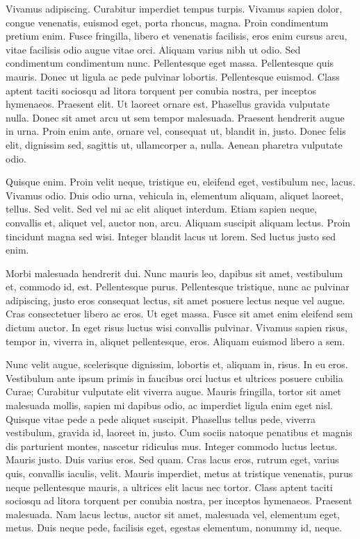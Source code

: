 \documentclass{article}
\begin{document}
Vivamus adipiscing. Curabitur imperdiet tempus turpis. Vivamus sapien dolor,
congue venenatis, euismod eget, porta rhoncus, magna. Proin condimentum pretium
enim. Fusce fringilla, libero et venenatis facilisis, eros enim cursus arcu,
vitae facilisis odio augue vitae orci. Aliquam varius nibh ut odio. Sed
condimentum condimentum nunc. Pellentesque eget massa. Pellentesque quis
mauris. Donec ut ligula ac pede pulvinar lobortis. Pellentesque euismod. Class
aptent taciti sociosqu ad litora torquent per conubia nostra, per inceptos
hymenaeos. Praesent elit. Ut laoreet ornare est. Phasellus gravida vulputate
nulla. Donec sit amet arcu ut sem tempor malesuada. Praesent hendrerit augue in
urna. Proin enim ante, ornare vel, consequat ut, blandit in, justo. Donec felis
elit, dignissim sed, sagittis ut, ullamcorper a, nulla. Aenean pharetra vulputate
odio.

Quisque enim. Proin velit neque, tristique eu, eleifend eget, vestibulum
nec, lacus. Vivamus odio. Duis odio urna, vehicula in, elementum aliquam,
aliquet laoreet, tellus. Sed velit. Sed vel mi ac elit aliquet interdum. Etiam
sapien neque, convallis et, aliquet vel, auctor non, arcu. Aliquam suscipit
aliquam lectus. Proin tincidunt magna sed wisi. Integer blandit lacus ut lorem.
Sed luctus justo sed enim.

Morbi malesuada hendrerit dui. Nunc mauris leo, dapibus sit amet, vestibulum
et, commodo id, est. Pellentesque purus. Pellentesque tristique, nunc ac
pulvinar adipiscing, justo eros consequat lectus, sit amet posuere lectus neque
vel augue. Cras consectetuer libero ac eros. Ut eget massa. Fusce sit amet enim
eleifend sem dictum auctor. In eget risus luctus wisi convallis pulvinar.
Vivamus sapien risus, tempor in, viverra in, aliquet pellentesque, eros.
Aliquam euismod libero a sem.

Nunc velit augue, scelerisque dignissim, lobortis et, aliquam in, risus. In
eu eros. Vestibulum ante ipsum primis in faucibus orci luctus et ultrices
posuere cubilia Curae; Curabitur vulputate elit viverra augue. Mauris
fringilla, tortor sit amet malesuada mollis, sapien mi dapibus odio, ac
imperdiet ligula enim eget nisl. Quisque vitae pede a pede aliquet suscipit.
Phasellus tellus pede, viverra vestibulum, gravida id, laoreet in, justo. Cum
sociis natoque penatibus et magnis dis parturient montes, nascetur ridiculus
mus. Integer commodo luctus lectus. Mauris justo. Duis varius eros. Sed quam.
Cras lacus eros, rutrum eget, varius quis, convallis iaculis, velit. Mauris
imperdiet, metus at tristique venenatis, purus neque pellentesque mauris, a
ultrices elit lacus nec tortor. Class aptent taciti sociosqu ad litora torquent
per conubia nostra, per inceptos hymenaeos. Praesent malesuada. Nam lacus
lectus, auctor sit amet, malesuada vel, elementum eget, metus. Duis neque pede,
facilisis eget, egestas elementum, nonummy id, neque.
\end{document}
